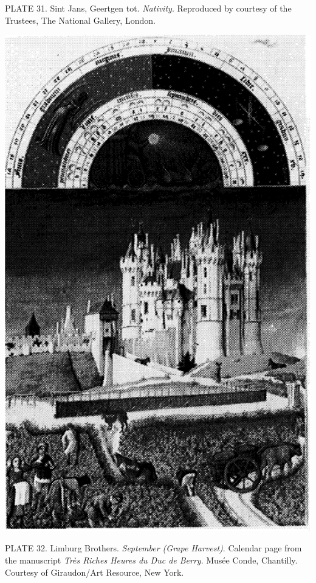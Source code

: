 PLATE 31. Sint Jans, Geertgen tot. \emph{Nativity}. Reproduced by
courtesy of the Trustees, The National Gallery, London.

\protect\hypertarget{20_ILLUSTRATIONS_FOLLOW_PAGE.xhtmlux5cux23id_29}{}{}\includegraphics{include/html/images/349_1.png}

PLATE 32. Limburg Brothers. \emph{September (Grape Harvest)}. Calendar
page from the manuscript \emph{Très Riches Heures du Duc de Berry}.
Musée Conde, Chantilly. Courtesy of Giraudon/Art Resource, New York.

